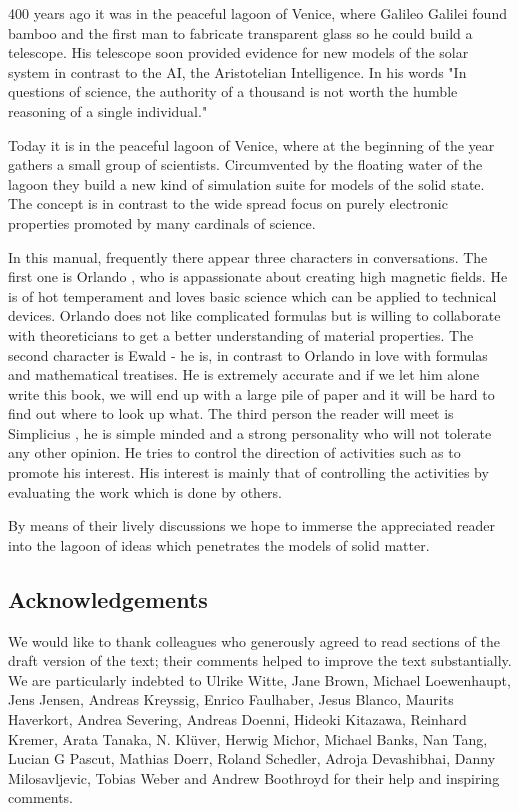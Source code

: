 \documentclass[twoside]{article}
\newcommand{\oo}{Orlando }
\newcommand{\ee}{Ewald }
\newcommand{\pp}{Simplicius }
\begin{document}
400 years ago it was in the peaceful lagoon of Venice, where Galileo Galilei found bamboo
 and the first man to fabricate transparent glass so he could build a telescope.  
His telescope soon provided evidence for new models of the solar system in contrast
to the AI, the Aristotelian Intelligence. In his words "In questions of science, 
the authority of a thousand is not worth the humble reasoning of a single individual."

Today it is in the peaceful lagoon of Venice, where at the beginning of the year gathers a small
group of scientists. Circumvented by the floating water of the lagoon they
 build a new kind of simulation suite for models of the solid state.
The concept is in contrast to the wide spread focus on purely electronic properties
promoted by many cardinals of science. 

In this manual, frequently there appear three characters in conversations. The 
first one is \oo, who is appassionate about creating high magnetic fields.
He is of hot temperament and loves basic science which can be applied to 
technical devices. \oo  does not like complicated formulas but is willing
to collaborate with theoreticians to get a better understanding of material properties.
The second character is \ee - he is, in contrast to \oo in love with
formulas and mathematical treatises. He is extremely accurate and 
if we let him alone write this book, we will
end up with a large pile of paper and it will be hard to find out where to
look up what. The third person the reader will meet is \pp, 
 he is  simple minded and a
strong personality who will not tolerate any other opinion. He tries to
control the direction of activities such as to promote his interest. His 
interest is mainly that of controlling the activities by evaluating the work
which is done by others. 

By means of their lively discussions we hope to immerse
 the appreciated reader into the lagoon of ideas which penetrates
 the models of solid matter.








\subsection*{Acknowledgements}

We would like to thank colleagues who generously agreed to read sections of the draft version
of the text; their comments helped to improve the text substantially. We are particularly indebted to
Ulrike Witte, Jane Brown, Michael Loewenhaupt, Jens Jensen, Andreas Kreyssig, Enrico Faulhaber,
Jesus Blanco, Maurits Haverkort, Andrea Severing,
Andreas Doenni, Hideoki Kitazawa, Reinhard Kremer, Arata Tanaka, N. Kl\"uver, Herwig Michor,
Michael Banks, Nan Tang, Lucian G Pascut, Mathias Doerr, Roland Schedler, Adroja Devashibhai, Danny Milosavljevic,
Tobias Weber
 and Andrew Boothroyd for their help and inspiring comments.
\end{document}

